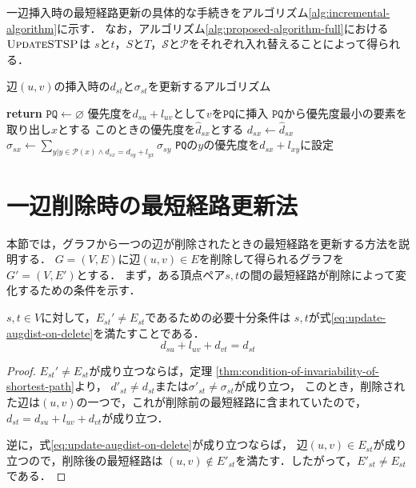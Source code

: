 一辺挿入時の最短経路更新の具体的な手続きをアルゴリズム\ref{alg:incremental-algorithm}に示す．
なお，アルゴリズム\ref{alg:proposed-algorithm-full}における$\textproc{UpdateSTSP}$は
$s$と$t$，$S$と$T$，$\mathcal{S}$と$\mathcal{P}$をそれぞれ入れ替えることによって得られる．

\begin{algorithm}[tb]
  \caption{辺$(u,v)$の挿入時の$d_{st}$と$\sigma_{st}$を更新するアルゴリズム}
  \label{alg:incremental-algorithm}
  \begin{algorithmic}[1]\small
    \State \textbf{return}
    \EndIf
    \State $\texttt{PQ}\gets\varnothing$
    \State 優先度を$d_{su}+l_{uv}$として$v$を$\texttt{PQ}$に挿入
    \State $\texttt{PQ}$から優先度最小の要素を取り出し$x$とする
    \State このときの優先度を$\hat{d}_{sx}$とする
    \State $d_{sx}\gets\hat{d}_{sx}$
    \State $\sigma_{sx}\gets\sum_{y|y\in\mathcal{P}(x)\land d_{sx}=d_{sy}+l_{yx}}\sigma_{sy}$
    \State \texttt{PQ}の$y$の優先度を$d_{sx}+l_{xy}$に設定
    \EndIf
    \EndFor
    \EndWhile
    \EndProcedure
  \end{algorithmic}
\end{algorithm}

\section{一辺削除時の最短経路更新法}
\label{sect:update-apsp-on-delete}
本節では，グラフから一つの辺が削除されたときの最短経路を更新する方法を説明する．
$G=(V,E)$に辺$(u,v)\in E$を削除して得られるグラフを$G'=(V,E')$とする．
まず，ある頂点ペア$s,t$の間の最短経路が削除によって変化するための条件を示す．

\begin{lemma}
  \label{lmm:update-augdist-on-delete}
  $s,t\in V$に対して，$E_{st}'\neq E_{st}$であるための必要十分条件は
  $s,t$が式\eqref{eq:update-augdist-on-delete}を満たすことである．
  \begin{equation}
    d_{su}+l_{uv}+d_{vt}=d_{st}
    \label{eq:update-augdist-on-delete}
  \end{equation}
\end{lemma}
\begin{proof}
  $E_{st}'\neq E_{st}$が成り立つならば，定理
  \ref{thm:condition-of-invariability-of-shortest-path}より，
  $d'_{st}\neq d_{st}$または$\sigma'_{st}\neq\sigma_{st}$が成り立つ，
  このとき，削除された辺は$(u,v)$の一つで，これが削除前の最短経路に含まれていたので，
  $d_{st}=d_{su}+l_{uv}+d_{vt}$が成り立つ．

  逆に，式\eqref{eq:update-augdist-on-delete}が成り立つならば，
  辺$(u,v)\in E_{st}$が成り立つので，削除後の最短経路は
  $(u,v)\notin E'_{st}$を満たす．したがって，$E'_{st}\neq E_{st}$である．
\end{proof}

